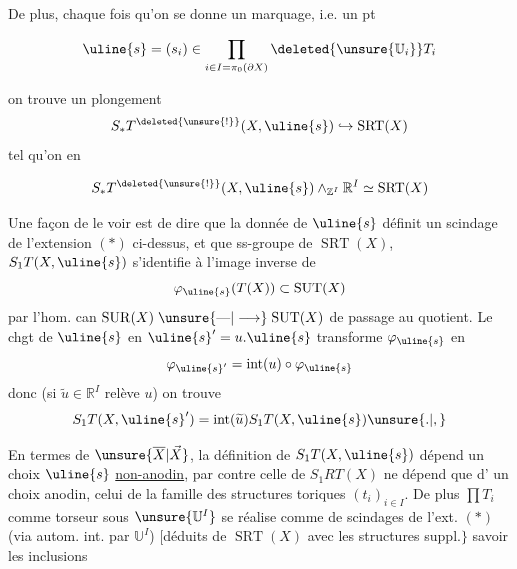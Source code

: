 De plus, chaque fois qu'on se donne un
marquage, i.e. un pt 

\[
\uline{s}=(s_i)\in
\prod_{i\in I=\pi_0(\partial X)}
\deleted{\unsure{\mathbb U_i}}T_i
\]


on trouve un plongement
\[
S_*T^{\deleted{\unsure{!}}}(X,\uline{s})\hookrightarrow\operatorname{SRT}(X)
\]
tel qu'on en 

\[
S_*T^{\deleted{\unsure{!}}}(X,\uline{s})
\mathbin{\wedge}_{\mathbb Z^I}\mathbb R^I
\simeq\operatorname{SRT}(X)
\]



Une façon de le voir est de dire que
la donnée de $\uline{s}$ définit un scindage
 de
l'extension $(*)$ ci-dessus, et que 
ss-groupe de $\operatorname{SRT}(X)$,
$S_1T(X,\uline{s})$ s'identifie
à l'image inverse de
\[
\varphi_{\uline{s}}(T(X))\subset\operatorname{SUT}(X)
\]
par l'hom. can
$\operatorname{SUR}(X)\mathrel{\unsure{\text{---}|\longrightarrow}}\operatorname{SUT}(X)$
de passage au quotient. Le chgt de
$\uline{s}$ en $\uline{s}'=u.\uline{s}$
transforme $\varphi_{\uline{s}}$ en
\[
\varphi_{\uline{s}'}=\operatorname{int}(u)\circ\varphi_{\uline{s}}
\]
donc (si $\widetilde u\in\mathbb R^I$ relève $u$) on trouve
\[
S_1T(X,\uline{s}')
=\operatorname{int}(\widetilde u)S_1T(X,\uline{s})\unsure{.|,}
\]

En termes de $\unsure{\overline X|\vec X}$, la définition de
$S_1T(X,\uline{s})$
dépend un choix $\uline{s}$ \uline{non-anodin},
par contre celle de $S_1RT(X)$ ne dépend que d'
un choix anodin, celui de la famille des
structures toriques $(t_i)_{i\in I}$.
De plus $\prod T_i$ comme
torseur sous $\unsure{\mathbb U^I}$ se réalise
comme  de scindages de l'ext. $(*)$
(via autom. int. par $\mathbb U^I$)
$\bigl[$déduits de $\operatorname{SRT}(X)$
avec les structures suppl.$\bigr\}$
savoir\unsure{)|,} les inclusions


